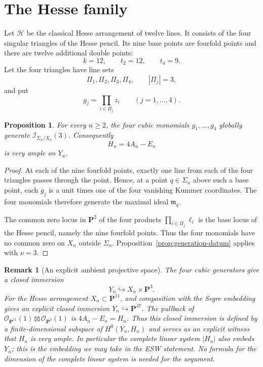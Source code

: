 \documentclass[11pt]{article}
\newtheorem{proposition}[theorem]{Proposition}
\newtheorem{remark}[theorem]{Remark}
\newcommand{\PP}{\mathbf P}
\newcommand{\OO}{\mathcal O}
\newcommand{\cI}{\mathcal I}
\newcommand{\cH}{\mathcal H}
\begin{document}
\section{The Hesse family}\label{sec:hesse}

Let $\cH$ be the classical Hesse arrangement of twelve lines.  It consists of
the four singular triangles of the Hesse pencil.  Its nine base points are
fourfold points and there are twelve additional double points:
\begin{equation}\label{eq:hesse-incidence}
        k=12,\qquad t_2=12,\qquad t_4=9.
\end{equation}
Let the four triangles have line sets
\[
        \Pi_1,\Pi_2,\Pi_3,\Pi_4,
        \qquad |\Pi_j|=3,
\]
and put
\[
        g_j=\prod_{i\in\Pi_j}z_i\qquad(j=1,\ldots,4).
\]

\begin{proposition}\label{prop:hesse-generation}
For every $n\ge2$, the four cubic monomials $g_1,\ldots,g_4$ globally generate
$\cI_{\Sigma_n/X_n}(3)$.  Consequently
\[
        H_n=4A_n-E_n
\]
is very ample on $Y_n$.
\end{proposition}

\begin{proof}
At each of the nine fourfold points, exactly one line from each of the four
triangles passes through the point.  Hence, at a point $q\in\Sigma_n$ above such
a base point, each $g_j$ is a unit times one of the four vanishing Kummer
coordinates.  The four monomials therefore generate the maximal ideal
$\mathfrak m_q$.

The common zero locus in $\PP^2$ of the four products
$\prod_{i\in\Pi_j}\ell_i$ is the base locus of the Hesse pencil, namely the nine
fourfold points.  Thus the four monomials have no common zero on $X_n$ outside
$\Sigma_n$.  Proposition~\ref{prop:generation-datum} applies with $\nu=3$.
\end{proof}


\begin{remark}[An explicit ambient projective space]\label{rem:hesse-ambient}
The four cubic generators give a closed immersion
\[
   Y_n\hookrightarrow X_n\times\PP^3.
\]
For the Hesse arrangement $X_n\subset\PP^{11}$, and composition with the Segre
embedding gives an explicit closed immersion $Y_n\hookrightarrow\PP^{47}$.  The
pullback of $\OO_{\PP^{11}}(1)\boxtimes\OO_{\PP^3}(1)$ is
$4A_n-E_n=H_n$.  Thus this closed immersion is defined by a finite-dimensional
subspace of $H^0(Y_n,H_n)$ and serves as an explicit witness that $H_n$ is very
ample.  In particular the complete linear system $|H_n|$ also embeds $Y_n$; this is
the embedding we may take in the ESW statement.  No formula for the dimension of
the complete linear system is needed for the argument.
\end{remark}
\end{document}

